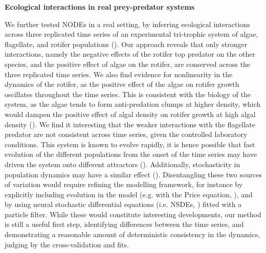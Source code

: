 \documentclass[11pt, oneside]{article}
\begin{document}
\textbf{Ecological interactions in real prey-predator systems}

We further tested NODEs in a real setting, by inferring ecological interactions across three replicated time series of an experimental tri-trophic system of algae, flagellate, and rotifer populations (\cite{Hiltunen2013}). 
Our approach reveals that only stronger interactions, namely the negative effects of the rotifer top predator on the other species, and the positive effect of algae on the rotifer, are conserved across the three replicated time series.
We also find evidence for nonlinearity in the dynamics of the rotifer, as the positive effect of the algae on rotifer growth oscillates throughout the time series. 
This is consistent with the biology of the system, as the algae tends to form anti-predation clumps at higher density, which would dampen the positive effect of algal density on rotifer growth at high algal density (\cite{Yoshida2003,Hiltunen2013}).
We find it interesting that the weaker interactions with the flagellate predator are not consistent across time series, given the controlled laboratory conditions.
This system is known to evolve rapidly, it is hence possible that fast evolution of the different populations from the onset of the time series may have driven the system onto different attractors (\cite{Yoshida2003,Yoshida2007,Hiltunen2013}).
Additionally, stochasticity in population dynamics may have a similar effect (\cite{Dallas2021}).
Disentangling these two sources of variation would require refining the modelling framework, for instance by explicitly including evolution in the model (e.g. with the Price equation, \cite{Ellner2011}), and by using neural stochastic differential equations (i.e. NSDEs, \cite{Rackauckas2019}) fitted with a particle filter. 
While these would constitute interesting developments, our method is still a useful first step, identifying differences between the time series, and demonstrating a reasonable amount of deterministic consistency in the dynamics, judging by the cross-validation and fits.
\end{document}
